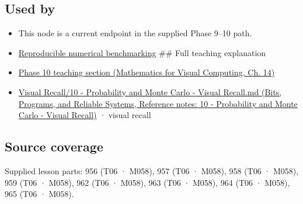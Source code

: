 \subsection{Used by}\label{appendix-bcc44e9d3d02-used-by}

\hypertarget{appendix-bcc44e9d3d02-used-by}{}

\begin{itemize}
\item
  This node is a current endpoint in the supplied Phase 9--10 path.
\item
  \hyperref[appendix-b9db93e28371]{Reproducible numerical benchmarking} \#\# Full teaching explanation
\item
  \href{../02-Mathematics-for-Visual-Computing/main.pdf\#nameddest=02-foundations-ii-ch030-inference-and-error-metrics-need-explicit-assumptions}{Phase 10 teaching section (Mathematics for Visual Computing, Ch. 14)}
\item
  \href{../01-Bits-Programs-and-Reliable-Systems/main.pdf\#nameddest=appendix-cb5af353ef77}{Visual Recall/10 - Probability and Monte Carlo - Visual Recall.md (Bits, Programs, and Reliable Systems, Reference notes: 10 - Probability and Monte Carlo - Visual Recall)} · visual recall
\end{itemize}

\subsection{Source coverage}\label{appendix-bcc44e9d3d02-source-coverage}

\hypertarget{appendix-bcc44e9d3d02-source-coverage}{}

Supplied lesson parts: 956 (T06 · M058), 957 (T06 · M058), 958 (T06 · M058), 959 (T06 · M058), 962 (T06 · M058), 963 (T06 · M058), 964 (T06 · M058), 965 (T06 · M058).
